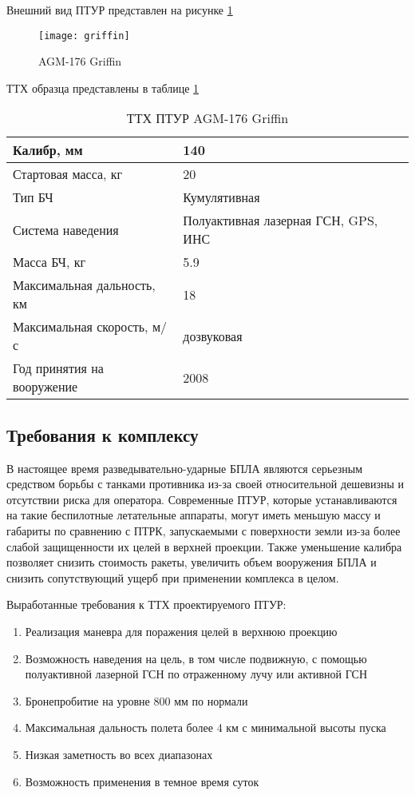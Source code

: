 Внешний вид ПТУР представлен на рисунке \ref{fig:griffin1}
\begin{figure}[!h]
	\texttt{[image: griffin]}
	\caption{AGM-176 Griffin}
	\label{fig:griffin1}
\end{figure}

ТТХ образца представлены в таблице \ref{tab:griffin_stats}
\begin{table}[!h]
	\begin{center}
		\caption{ТТХ ПТУР AGM-176 Griffin}
		\begin{tabular}{|l|l|}
  		\hline
		Калибр, мм & 140 \\ \hline
		Стартовая масса, кг & 20 \\ \hline
		Тип БЧ & Кумулятивная \\ \hline
		Система наведения & Полуактивная лазерная ГСН, GPS, ИНС \\ \hline
		Масса БЧ, кг & 5.9 \\ \hline
		Максимальная дальность, км & 18 \\ \hline
		Максимальная скорость, м/с & дозвуковая \\ \hline
		Год принятия на вооружение & 2008 \\ \hline
		\end{tabular}
		\label{tab:griffin_stats}
	\end{center}
\end{table}
\subsection{Требования к комплексу}
В настоящее время разведывательно-ударные БПЛА являются серьезным средством борьбы с танками противника из-за своей относительной дешевизны и отсутствии риска для оператора. Современные ПТУР, которые устанавливаются на такие беспилотные летательные аппараты, могут иметь меньшую массу и габариты по сравнению с ПТРК, запускаемыми с поверхности земли из-за более слабой защищенности их целей в верхней проекции. Также уменьшение калибра позволяет снизить стоимость ракеты, увеличить объем вооружения БПЛА и снизить сопутствующий ущерб при применении комплекса в целом.

Выработанные требования к ТТХ проектируемого ПТУР:
\begin{enumerate}[1.]
	\item Реализация маневра для поражения целей в верхнюю проекцию
	\item Возможность наведения на цель, в том числе подвижную, с помощью полуактивной лазерной ГСН по отраженному лучу или активной ГСН
	\item Бронепробитие на уровне 800 мм по нормали
	\item Максимальная дальность полета более 4 км с минимальной высоты пуска
	\item Низкая заметность во всех диапазонах
	\item Возможность применения в темное время суток
\end{enumerate}

